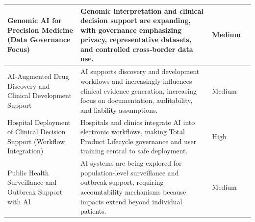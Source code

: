 \begin{tcolorbox}[
  colback=white,
  colframe=aivanavy,
  boxrule=0.9pt,
  arc=1.5pt,
  left=2pt,
  right=2pt,
  top=3pt,
  bottom=3pt,
  breakable,
]
\begin{longtable}{|>{\raggedright\arraybackslash}p{}|>{\raggedright\arraybackslash}p{}|>{\centering\arraybackslash}p{}|>{\centering\arraybackslash}p{}|}
Genomic AI for Precision Medicine (Data Governance Focus) & Genomic interpretation and clinical decision support are expanding, with governance emphasizing privacy, representative datasets, and controlled cross-border data use. & Medium & 2020 \\ \hline
AI-Augmented Drug Discovery and Clinical Development Support & AI supports discovery and development workflows and increasingly influences clinical evidence generation, increasing focus on documentation, auditability, and liability assumptions. & Medium & 2021 \\ \hline
Hospital Deployment of Clinical Decision Support (Workflow Integration) & Hospitals and clinics integrate AI into electronic workflows, making Total Product Lifecycle governance and user training central to safe deployment. & High & 2022 \\ \hline
Public Health Surveillance and Outbreak Support with AI & AI systems are being explored for population-level surveillance and outbreak support, requiring accountability mechanisms because impacts extend beyond individual patients. & Medium & 2020 \\ \hline
\end{longtable}
\end{tcolorbox}